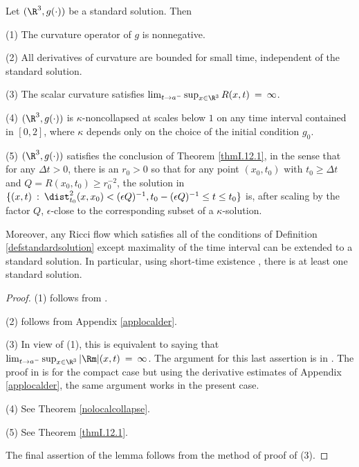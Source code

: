 \begin{lemma}
  \label{lem:kl-standard-solutions-existence-kappa-solutions}

\label{lemstandard0}
Let $(\R^3,g(\cdot))$ be a standard solution.  Then

(1) The curvature operator of $g$ is nonnegative.

(2) All derivatives of curvature are bounded for small time,
independent of the standard solution.

(3) The scalar curvature satisfies $\lim_{t \rightarrow a^-}
\sup_{x \in \R^3} R(x,t) \: = \: \infty$.

(4) $(\R^3,g(\cdot))$ is $\kappa$-noncollapsed at scales below $1$ on any time
interval contained in $[0,2]$, where
$\kappa$ depends only on the choice of the initial condition $g_0$.

(5) $(\R^3,g(\cdot))$ satisfies the conclusion of Theorem \ref{thmI.12.1},
in the sense that for any $\Delta t > 0$, there is an $r_0 > 0$ so that
for any point $(x_0, t_0)$ with $t_0 \ge \Delta t$ and
$Q = R(x_0, t_0) \ge r_0^{-2}$, the solution in
$\{(x,t) \: : \: \dist_{t_0}^2(x, x_0) < (\epsilon Q)^{-1}, t_0 - (\epsilon Q)^{-1}
\le t \le t_0\}$ is, after scaling by the factor $Q$, $\epsilon$-close to the
corresponding subset of a $\kappa$-solution.

Moreover, any Ricci flow which satisfies all of the conditions of Definition
\ref{defstandardsolution} except maximality of the time interval can be
extended to a standard solution. In particular, using short-time
existence \cite[Theorem 1.1]{Shi2}, there is at least one standard solution.
\end{lemma}
\begin{proof}
(1) follows from \cite[Theorem 4.14]{Shi3}.

(2) follows from Appendix \ref{applocalder}.

(3)
In view of (1), this is equivalent to saying that
$\lim_{t \rightarrow a^-}
\sup_{x \in \R^3} |\Rm|(x,t) \: = \: \infty$. The argument for
this last assertion
is in \cite[Chapter 6.7.2]{Chow-Knopf}. The proof in
\cite[Chapter 6.7.2]{Chow-Knopf}
is for the compact case but using the derivative estimates of
Appendix \ref{applocalder}, the same argument works in
the present case.


(4) See Theorem \ref{nolocalcollapse}.

(5) See Theorem \ref{thmI.12.1}.

The final assertion of the lemma follows from the method of
proof of (3).
\end{proof}

